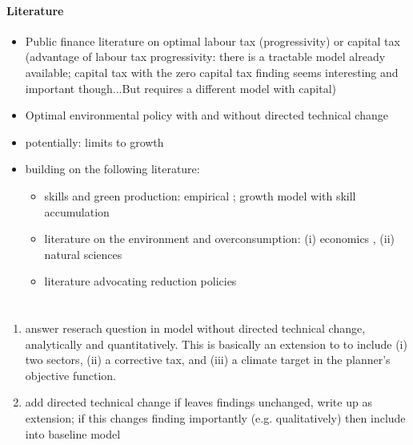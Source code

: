 \paragraph{Literature}
\begin{itemize}
\item Public finance literature on optimal labour tax (progressivity) or capital tax (advantage of labour tax progressivity: there is a tractable model already available; capital tax with the zero capital tax finding seems interesting and important though...But requires a different model with capital) \citep{Heathcote2017OptimalFramework, Conesa2009TaxingAll, Domeij2004OnTaxes}
\item Optimal environmental policy with and without directed technical change \citep{Acemoglu2012TheChange, Acemoglu2016TransitionTechnology, Fried2018ClimateAnalysis, Barrage2019OptimalPolicy, Golosov2014OptimalEquilibrium, Hassler2016EnvironmentalMacroeconomics}
\item potentially: limits to growth \citep{Stokey1998AreGrowth, Jones2016LifeGrowth, Arrow2004AreMuch}
\item building on the following literature: \begin{itemize}
\item skills and green production: empirical \citep{Consoli2016DoCapital, Bowen2018CharacterisingComposition, Borissov2019CarbonDevelopment}; growth model with skill accumulation \citep{Borissov2019CarbonDevelopment}
\item literature on the environment and overconsumption: (i) economics \citep{Dasgupta2021, Brock2005ChapterEmpirics, Arrow2004AreMuch, Cohen2019AnnualSubstitutable}, (ii) natural sciences \citep{ Rockstrom2009AHumanity, Rogelj2018MitigationDevelopment.}
\item literature advocating reduction policies \citep{Schor2005SustainableReduction, Pullinger2014WorkingDesign}

\end{itemize}
\end{itemize}

\section{}\label{sec:rm}
\begin{enumerate}
\item answer reserach question in model without directed technical change, analytically and quantitatively. This is basically an extension to \cite{Heathcote2017OptimalFramework} to include (i) two sectors, (ii) a corrective tax, and (iii) a climate target in the planner's objective function.
\item add directed technical change \ar if leaves findings unchanged, write up as extension; if this changes finding importantly (e.g. qualitatively) then include into baseline model
\end{enumerate}